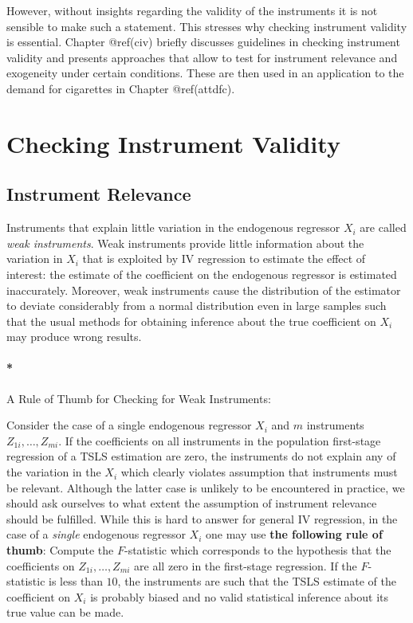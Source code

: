 \documentclass[
  letterpaper,
  DIV=11,
  numbers=noendperiod]{scrreprt}
\let\oldparagraph\paragraph
\renewcommand{\paragraph}[1]{\oldparagraph{#1}\mbox{}}
\theoremstyle{definition}
\theoremstyle{plain}
\theoremstyle{plain}
\theoremstyle{remark}
\begin{document}
{However, without insights regarding the validity of the instruments it
is not sensible to make such a statement. This stresses why checking
instrument validity is essential. Chapter @ref(civ) briefly discusses
guidelines in checking instrument validity and presents approaches that
allow to test for instrument relevance and exogeneity under certain
conditions. These are then used in an application to the demand for
cigarettes in Chapter @ref(attdfc).

\hypertarget{civ}{%
\section{Checking Instrument Validity}\label{civ}}

\hypertarget{instrument-relevance}{%
\subsection{Instrument Relevance}\label{instrument-relevance}}

Instruments that explain little variation in the endogenous regressor
\(X_i\) are called \emph{weak instruments}. Weak instruments provide
little information about the variation in \(X_i\) that is exploited by
IV regression to estimate the effect of interest: the estimate of the
coefficient on the endogenous regressor is estimated inaccurately.
Moreover, weak instruments cause the distribution of the estimator to
deviate considerably from a normal distribution even in large samples
such that the usual methods for obtaining inference about the true
coefficient on \(X_i\) may produce wrong results.

\paragraph*{A Rule of Thumb for Checking for Weak Instruments:}

Consider the case of a single endogenous regressor \(X_i\) and \(m\)
instruments \(Z_{1i},\dots,Z_{mi}\). If the coefficients on all
instruments in the population first-stage regression of a TSLS
estimation are zero, the instruments do not explain any of the variation
in the \(X_i\) which clearly violates assumption that instruments must
be relevant. Although the latter case is unlikely to be encountered in
practice, we should ask ourselves to what extent the assumption of
instrument relevance should be fulfilled. While this is hard to answer
for general IV regression, in the case of a \textit{single} endogenous
regressor \(X_i\) one may use \textbf{the following rule of thumb}:
Compute the \(F\)-statistic which corresponds to the hypothesis that the
coefficients on \(Z_{1i},\dots,Z_{mi}\) are all zero in the first-stage
regression. If the \(F\)-statistic is less than \(10\), the instruments
are  such that the TSLS estimate of the coefficient on \(X_i\)
is probably biased and no valid statistical inference about its true
value can be made.

}
\end{document}
